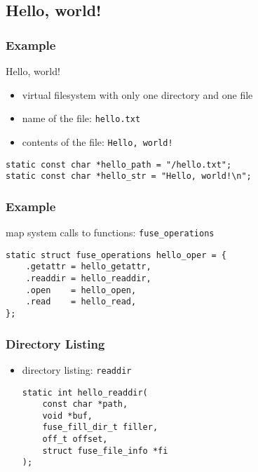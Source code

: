 \documentclass[dvipsnames]{beamer}
\begin{document}
\subsection{Hello, world!}

\begin{frame}[fragile]
  \frametitle{Example}

  \begin{exampleblock}{Hello, world!}
    \begin{itemize}
      \item virtual filesystem with only one directory and one file
      \item name of the file: \texttt{hello.txt}
      \item contents of the file: \lstinline|Hello, world!|
    \end{itemize}

    \begin{lstlisting}[frame=single]
static const char *hello_path = "/hello.txt";
static const char *hello_str = "Hello, world!\n";
    \end{lstlisting}
  \end{exampleblock}
\end{frame}

\begin{frame}[fragile]
  \frametitle{Example}

  \begin{exampleblock}{map system calls to functions:
    \lstinline|fuse_operations|}
    \begin{lstlisting}
static struct fuse_operations hello_oper = {
    .getattr = hello_getattr,
    .readdir = hello_readdir,
    .open    = hello_open,
    .read    = hello_read,
};
    \end{lstlisting}
  \end{exampleblock}
\end{frame}

\begin{frame}[fragile]
  \frametitle{Directory Listing}

  \begin{itemize}
    \item directory listing: \lstinline|readdir|
    \begin{lstlisting}[style=syntax]
static int hello_readdir(
    const char *path,
    void *buf,
    fuse_fill_dir_t filler,
    off_t offset,
    struct fuse_file_info *fi
);
    \end{lstlisting}
  \end{itemize}
\end{frame}
\end{document}
